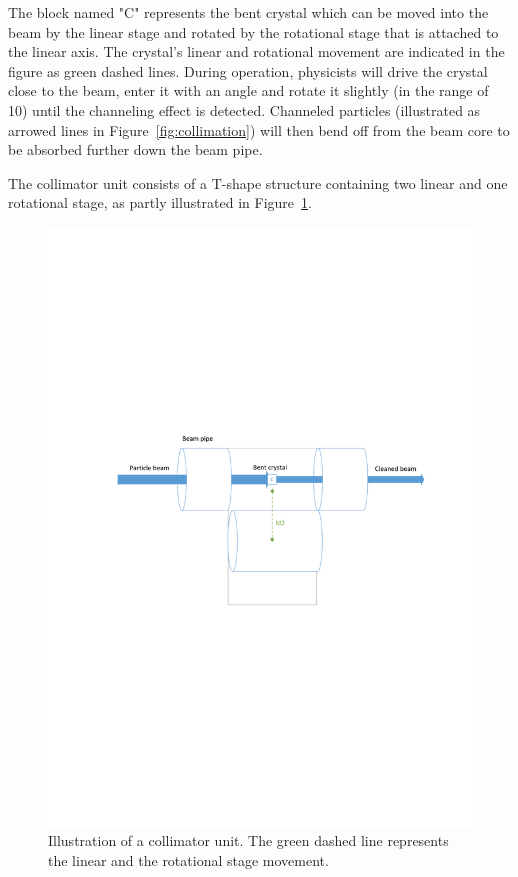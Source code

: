 The block named "C" represents the bent crystal which can be moved into the beam by the linear stage and rotated by the rotational stage that is attached to the linear axis. The crystal's linear and rotational movement are indicated in the figure as green dashed lines. During operation, physicists will drive the crystal close to the beam, enter it with an angle and rotate it slightly (in the range of \unit{10}{\milli\rad}) until the channeling effect is detected. Channeled particles (illustrated as arrowed lines in Figure~\ref{fig:collimation}) will then bend off from the beam core to be absorbed further down the beam pipe.

The collimator unit consists of a T-shape structure containing two linear and one rotational stage, as partly illustrated in Figure~\ref{fig:goniometer}.

\begin{figure}[h]
  \centering %
  \includegraphics[width=1\textwidth, trim= 2cm 12cm 1cm 10cm, clip=true]{fig/matlab/goniometer}
  \caption{\label{fig:goniometer}Illustration of a collimator unit. The green dashed line represents the linear and the rotational stage movement.}
\end{figure}


